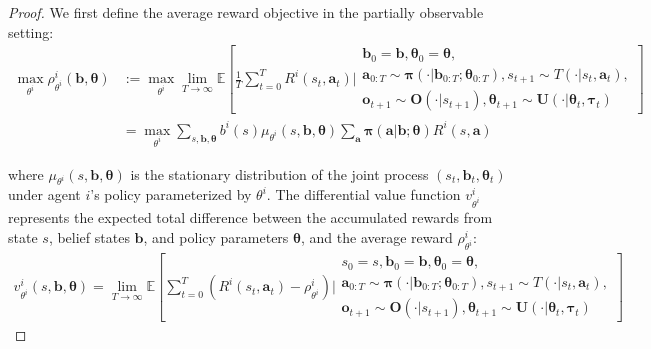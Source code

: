 \documentclass[a4paper,12pt]{report}
\begin{document}
\begin{proof}
    We first define the average reward objective in the partially observable setting:
    \begin{align}
        \max_{\theta^i}\rho^{i}_{\theta^i}(\boldsymbol{b}, \boldsymbol{\theta}) & := \max_{\theta^i}\lim_{T \to \infty}\mathbb{E}\left[ \frac{1}{T}\sum_{t=0}^{T} R^{i}(s_{t}, \boldsymbol{a}_{t}) \bigg| \begin{array}{c}\boldsymbol{b}_0= \boldsymbol{b}, \boldsymbol{\theta}_0= \boldsymbol{\theta}, \\ \boldsymbol{a}_{0:T} \sim \boldsymbol{\pi}(\cdot|\boldsymbol{b}_{0:T}; \boldsymbol{\theta}_{0:T}), s_{t+1} \sim T(\cdot|s_t, \boldsymbol{a}_t), \\ \boldsymbol{o}_{t+1} \sim \boldsymbol{O}(\cdot|s_{t+1}), \boldsymbol{\theta}_{t+1} \sim \boldsymbol{U}(\cdot|\boldsymbol{\theta}_t, \boldsymbol{\tau}_t)\end{array} \right] \\
                                                                                & = \max_{\theta^i}\sum_{s, \boldsymbol{b}, \boldsymbol{\theta}}b^{i}(s) \mu_{\theta^i}(s, \boldsymbol{b}, \boldsymbol{\theta}) \sum_{\boldsymbol{a}}\boldsymbol{\pi}(\boldsymbol{a}|\boldsymbol{b}; \boldsymbol{\theta}) R^{i}(s, \boldsymbol{a})
    \end{align}

    where $\mu_{\theta^i}(s, \boldsymbol{b}, \boldsymbol{\theta})$ is the stationary
    distribution of the joint process $(s_{t}, \boldsymbol{b}_{t}, \boldsymbol{\theta}
        _{t})$ under agent $i$'s policy parameterized by $\theta^{i}$. The
    differential value function $v^{i}_{\theta^i}$ represents the expected total
    difference between the accumulated rewards from state $s$, belief states $\boldsymbol
        {b}$, and policy parameters $\boldsymbol{\theta}$, and the average reward $\rho
        ^{i}_{\theta^i}$:
    \begin{align}
        v^{i}_{\theta^i}(s, \boldsymbol{b}, \boldsymbol{\theta}) = \lim_{T \to \infty}\mathbb{E}\left[ \sum_{t=0}^{T} \left(R^{i}(s_{t}, \boldsymbol{a}_{t}) - \rho^{i}_{\theta^i}\right) \bigg| \begin{array}{c}s_0=s, \boldsymbol{b}_0= \boldsymbol{b}, \boldsymbol{\theta}_0= \boldsymbol{\theta}, \\ \boldsymbol{a}_{0:T} \sim \boldsymbol{\pi}(\cdot|\boldsymbol{b}_{0:T}; \boldsymbol{\theta}_{0:T}), s_{t+1} \sim T(\cdot|s_t, \boldsymbol{a}_t), \\ \boldsymbol{o}_{t+1} \sim \boldsymbol{O}(\cdot|s_{t+1}), \boldsymbol{\theta}_{t+1} \sim \boldsymbol{U}(\cdot|\boldsymbol{\theta}_t, \boldsymbol{\tau}_t)\end{array} \right]
    \end{align}


\end{proof}
\end{document}
